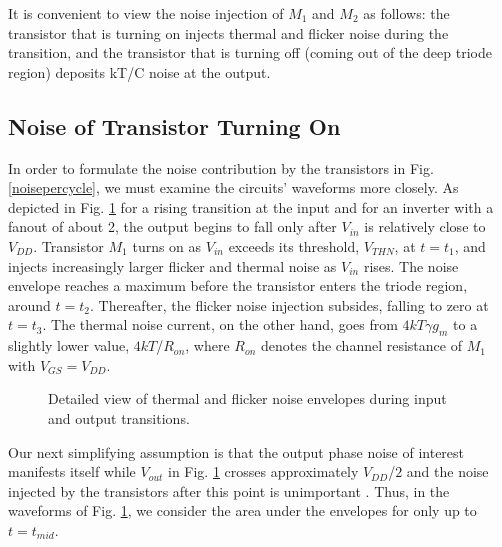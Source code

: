 It is convenient to view the noise injection of $M_1$ and $M_2$ as follows: the transistor that is turning on injects thermal and flicker noise
during the transition, and the transistor that is turning off (coming out of the deep triode region) deposits kT/C noise at the output.

\subsection{Noise of Transistor Turning On}
In order to formulate the noise contribution by the transistors in Fig. \ref{noisepercycle}, we must examine the circuits' waveforms more
closely. As depicted in Fig. \ref{noiseenvelope} for a rising transition at the input and for an inverter with a fanout of about 2, the output begins to fall only
after $V_{in}$ is relatively close to $V_{DD}$. Transistor $M_1$ turns on as $V_{in}$ exceeds its threshold, $V_{THN}$, at $t=t_1$, and injects increasingly
larger flicker and thermal noise as $V_{in}$ rises. The noise envelope reaches a maximum before the transistor enters the triode region, around
$t=t_2$. Thereafter, the flicker noise injection subsides, falling to zero at $t=t_3$. The thermal noise current, on the other hand, goes from
$4kT\gamma g_m$ to a slightly lower value, $4kT$/$R_{on}$, where $R_{on}$ denotes the channel resistance of $M_1$ with $V_{GS}=V_{DD}$.
\begin{figure}[htb]
\vspace{2.8in}
\caption{Detailed view of thermal and flicker noise envelopes during input and output transitions.}
\label{noiseenvelope}
\end{figure}

Our next simplifying assumption is that the output phase noise of interest manifests itself while $V_{out}$ in Fig. \ref{noiseenvelope} crosses
approximately $V_{DD}$/$2$ and the noise injected by the transistors after this point is unimportant \cite{Abidi}. Thus, in the waveforms of Fig.
\ref{noiseenvelope}, we consider the area under the envelopes for only up to $t=t_{mid}$. 

